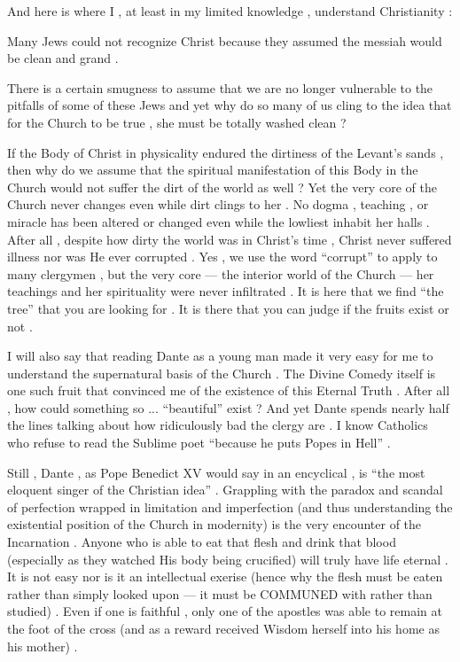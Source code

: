 \begin{footnotesize}
\begin{sffamily}
And here is where I , at least in my limited knowledge , understand Christianity :

Many Jews could not recognize Christ because they assumed the messiah would be clean and grand .

There is a certain smugness to assume that we are no longer vulnerable to the pitfalls of some of these Jews and yet why do so many of us cling to the idea that for the Church to be true , she must be totally washed clean ?

If the Body of Christ in physicality endured the dirtiness of the Levant's sands , then why do we assume that the spiritual manifestation of this Body in the Church would not suffer the dirt of the world as well ? Yet the very core of the Church never changes even while dirt clings to her . No dogma , teaching , or miracle has been altered or changed even while the lowliest inhabit her halls . After all , despite how dirty the world was in Christ's time , Christ never suffered illness nor was He ever corrupted . Yes , we use the word ``corrupt'' to apply to many clergymen , but the very core --- the interior world of the Church --- her teachings and her spirituality were never infiltrated . It is here that we find ``the tree'' that you are looking for . It is there that you can judge if the fruits exist or not .

I will also say that reading Dante as a young man made it very easy for me to understand the supernatural basis of the Church . The Divine Comedy itself is one such fruit that convinced me of the existence of this Eternal Truth . After all , how could something so ... ``beautiful'' exist ? And yet Dante spends nearly half the lines talking about how ridiculously bad the clergy are . I know Catholics who refuse to read the Sublime poet ``because he puts Popes in Hell'' .

Still , Dante , as Pope Benedict XV would say in an encyclical , is ``the most eloquent singer of the Christian idea'' . Grappling with the paradox and scandal of perfection wrapped in limitation and imperfection (and thus understanding the existential position of the Church in modernity) is the very encounter of the Incarnation . Anyone who is able to eat that flesh and drink that blood (especially as they watched His body being crucified) will truly have life eternal . It is not easy nor is it an intellectual exerise (hence why the flesh must be eaten rather than simply looked upon --- it must be COMMUNED with rather than studied) . Even if one is faithful , only one of the apostles was able to remain at the foot of the cross (and as a reward received Wisdom herself into his home as his mother) .


\end{sffamily}
\end{footnotesize}
